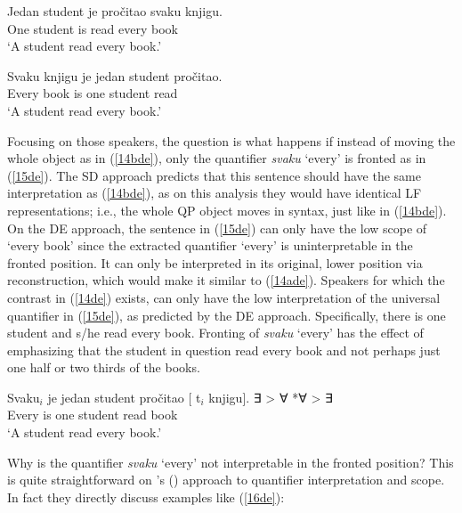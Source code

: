 \documentclass[output=paper]{langscibook}
\begin{document}
\begin{exe}
\ex \label{14de}
\begin{xlist}
\ex \label{14ade}
\gll Jedan student je pročitao svaku knjigu.\\
One student is read every book\\
\glt ‘A student read every book.’ 


\ex \label{14bde}
\gll Svaku knjigu je jedan student pročitao.\\
Every book is one student read\\
\glt ‘A student read every book.’ 

\end{xlist}
\end{exe}

Focusing on those speakers, the question is what happens if instead of moving the whole object as in (\ref{14bde}), only the quantifier \textit{svaku} ‘every’ is fronted as in (\ref{15de}). The SD approach predicts that this sentence should have the same interpretation as (\ref{14bde}), as on this analysis they would have identical LF representations; i.e., the whole QP object moves in syntax, just like in (\ref{14bde}). On the DE approach, the sentence in (\ref{15de}) can only have the low scope of ‘every book’ since the extracted quantifier ‘every’ is uninterpretable in the fronted position. It can only be interpreted in its original, lower position via reconstruction, which would make it similar to (\ref{14ade}). Speakers for which the contrast in (\ref{14de}) exists, can only have the low interpretation of the universal quantifier in (\ref{15de}), as predicted by the DE approach. Specifically, there is one student and s/he read every book. Fronting of \textit{svaku} ‘every’ has the effect of emphasizing that the student in question read every book and not perhaps just one half or two thirds of the books. 

\begin{exe}
\ex \label{15de}
\gll Svaku$_{i}$ je jedan student pročitao [ t$_{i}$ knjigu]. \hspace{14mm} \cmark ∃ > ∀ *∀ > ∃\\
Every is one student read {} book\\
\glt ‘A student read every book.’ 
\end{exe}

Why is the quantifier \textit{svaku} ‘every’ not interpretable in the fronted position? This is quite straightforward on \citeauthor{HeimKratzer1998}’s (\citeyear{HeimKratzer1998}) approach to quantifier interpretation and scope.  In fact they directly discuss examples like (\ref{16de}):
\end{document}
